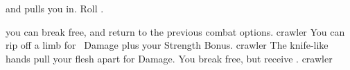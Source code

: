 and pulls you in.
Roll .

\begin{selectPath}
  {you can break free, and return to the previous combat options.}%
  {crawler}
  {You can rip off a limb for ~Damage plus your Strength Bonus.}%
  {crawler}
  {The knife-like hands pull your flesh apart for  Damage.}%
  {}
  {You break free, but receive .}%
  {crawler}
\end{selectPath}


